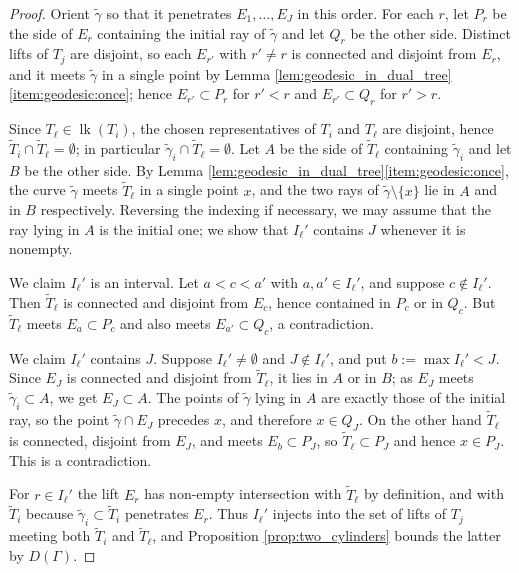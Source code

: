 \documentclass[12pt,a4paper]{amsart}
\numberwithin{equation}{section}
\theoremstyle{plain}
\theoremstyle{definition}
\theoremstyle{remark}
\begin{document}
\begin{proof}
    Orient $\tilde\gamma$ so that it penetrates $E_1, \ldots, E_J$ in this order.
    For each $r$, let $P_r$ be the side of $E_r$ containing the initial ray of $\tilde\gamma$ and let $Q_r$ be the other side.
    Distinct lifts of $T_j$ are disjoint, so each $E_{r'}$ with $r' \ne r$ is connected and disjoint from $E_r$, and it meets $\tilde\gamma$ in a single point by Lemma \ref{lem:geodesic_in_dual_tree}\eqref{item:geodesic:once}; hence $E_{r'} \subset P_r$ for $r' < r$ and $E_{r'} \subset Q_r$ for $r' > r$.

    Since $T_\ell \in \operatorname{lk}(T_i)$, the chosen representatives of $T_i$ and $T_\ell$ are disjoint, hence $\tilde T_i \cap \tilde T_\ell = \emptyset$; in particular $\tilde\gamma_i \cap \tilde T_\ell = \emptyset$.
    Let $A$ be the side of $\tilde T_\ell$ containing $\tilde\gamma_i$ and let $B$ be the other side.
    By Lemma \ref{lem:geodesic_in_dual_tree}\eqref{item:geodesic:once}, the curve $\tilde\gamma$ meets $\tilde T_\ell$ in a single point $x$, and the two rays of $\tilde\gamma \setminus \{x\}$ lie in $A$ and in $B$ respectively.
    Reversing the indexing if necessary, we may assume that the ray lying in $A$ is the initial one; we show that $I_\ell'$ contains $J$ whenever it is nonempty.

    We claim $I_\ell'$ is an interval.
    Let $a < c < a'$ with $a, a' \in I_\ell'$, and suppose $c \notin I_\ell'$.
    Then $\tilde T_\ell$ is connected and disjoint from $E_c$, hence contained in $P_c$ or in $Q_c$.
    But $\tilde T_\ell$ meets $E_a \subset P_c$ and also meets $E_{a'} \subset Q_c$, a contradiction.

    We claim $I_\ell'$ contains $J$.
    Suppose $I_\ell' \ne \emptyset$ and $J \notin I_\ell'$, and put $b := \max I_\ell' < J$.
    Since $E_J$ is connected and disjoint from $\tilde T_\ell$, it lies in $A$ or in $B$; as $E_J$ meets $\tilde\gamma_i \subset A$, we get $E_J \subset A$.
    The points of $\tilde\gamma$ lying in $A$ are exactly those of the initial ray, so the point $\tilde\gamma \cap E_J$ precedes $x$, and therefore $x \in Q_J$.
    On the other hand $\tilde T_\ell$ is connected, disjoint from $E_J$, and meets $E_b \subset P_J$, so $\tilde T_\ell \subset P_J$ and hence $x \in P_J$.
    This is a contradiction.

    For $r \in I_\ell'$ the lift $E_r$ has non-empty intersection with $\tilde T_\ell$ by definition, and with $\tilde T_i$ because $\tilde\gamma_i \subset \tilde T_i$ penetrates $E_r$.
    Thus $I_\ell'$ injects into the set of lifts of $T_j$ meeting both $\tilde T_i$ and $\tilde T_\ell$, and Proposition \ref{prop:two_cylinders} bounds the latter by $D(\Gamma)$.
\end{proof}
\end{document}

